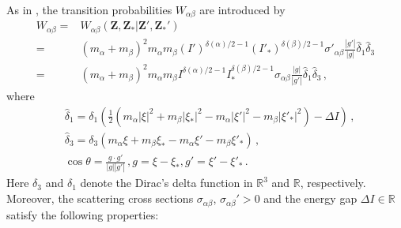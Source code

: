 \documentclass[reqno,11pt]{amsart}
\numberwithin{equation}{section}
\def\R{\mathbb{R}}
\begin{document}
As in \cite{Bernhoff-AAM-2023,Bernhoff-KRM-2023,N.Bernhoff-2023}, the transition probabilities $W_{\alpha \beta }$ are introduced by
\begin{equation}\label{eq2.10}
	\begin{aligned}
		W_{\alpha \beta } 
		= & W_{\alpha \beta } ( \mathbf{Z} , \mathbf{Z}_* | \mathbf{Z}', \mathbf{Z}_*' ) \\
		= & (m_\alpha + m_\beta )^2 m_\alpha m_\beta (I')^{\delta(\alpha)/2-1} (I'_*)^{\delta(\beta)/2-1} \sigma'_{\alpha \beta } \tfrac{|g'|}{|g|} \hat{\delta}_1 \hat{\delta}_3\\
		= & (m_\alpha + m_\beta )^2 m_\alpha m_\beta I^{\delta(\alpha)/2-1} I_*^{\delta(\beta)/2-1} \sigma_{\alpha \beta } \tfrac{|g|}{|g'|} \hat{\delta}_1 \hat{\delta}_3 \,,
	\end{aligned}
\end{equation}
where
\begin{equation*}
	\begin{aligned}
		& \hat{\delta}_1 = \delta_1 ( \tfrac{1}{2} ( m_\alpha |\xi|^2 + m_\beta |\xi_*|^2 - m_\alpha |\xi'|^2 - m_\beta |\xi'_*|^2 ) -\Delta I ) \,,\\
		& \hat{\delta}_3 = \delta_3 ( m_\alpha \xi + m_\beta \xi_* - m_\alpha \xi' - m_\beta \xi'_* ) \,, \\
		& \cos \theta =\tfrac{g \cdot g'}{|g| |g'|} \,, g= \xi -\xi_* ,g'=\xi '- \xi'_* \,.
	\end{aligned}
\end{equation*}
Here $\delta_3$ and $\delta_1$ denote the Dirac's delta function in $\R^3$ and $\R$, respectively. Moreover, the scattering cross sections $ \sigma_{\alpha \beta } $, $\sigma_{\alpha \beta }' > 0$ and the energy gap $ \Delta I \in \R $ satisfy the following properties:
\end{document}
